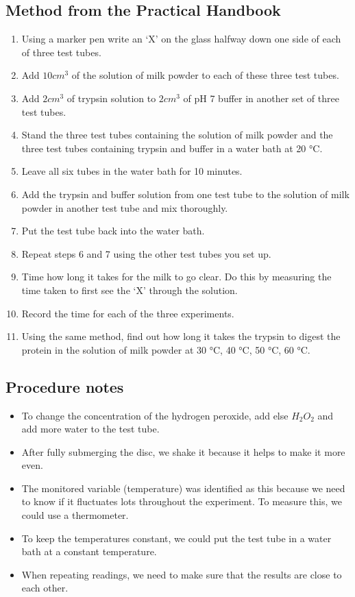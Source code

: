 \documentclass{thomasClass}
\begin{document}
\subsection{Method from the Practical Handbook}
\begin{enumerate}
    \item Using a marker pen write an ‘X’ on the glass halfway down one side of each of three test tubes.
    \item Add $10 cm^3$ of the solution of milk powder to each of these three test tubes.
    \item Add $2 cm^3$ of trypsin solution to $2 cm^3$ of pH 7 buffer in another set of three test tubes.
    \item Stand the three test tubes containing the solution of milk powder and the three test tubes containing trypsin and buffer in a water bath at 20 °C.
    \item Leave all six tubes in the water bath for 10 minutes.
    \item Add the trypsin and buffer solution from one test tube to the solution of milk powder in another test tube and mix thoroughly.
    \item Put the test tube back into the water bath.
    \item Repeat steps 6 and 7 using the other test tubes you set up.
    \item Time how long it takes for the milk to go clear.  Do this by measuring the time taken to first see the ‘X’ through the solution.
    \item Record the time for each of the three experiments.
    \item Using the same method, find out how long it takes the trypsin to digest the protein in the solution of milk powder at 30 °C, 40 °C, 50 °C, 60 °C.
\end{enumerate}

\subsection{Procedure notes}
\begin{itemize}
    \item To change the concentration of the hydrogen peroxide, add else $H_2O_2$ and add more water to the test tube.
    \item After fully submerging the disc, we shake it because it helps to make it more even.
    \item The monitored variable (temperature) was identified as this because we need to know if it fluctuates lots throughout the experiment. To measure this, we could use a thermometer.
    \item To keep the temperatures constant, we could put the test tube in a water bath at a constant temperature.
    \item When repeating readings, we need to make sure that the results are close to each other.
\end{itemize}
\end{document}

